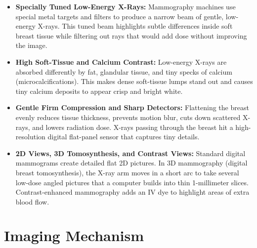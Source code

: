 \begin{itemize}
    \item \textbf{Specially Tuned Low-Energy X-Rays:} Mammography machines use special metal targets and filters to produce a narrow beam of gentle, low-energy X-rays. This tuned beam highlights subtle differences inside soft breast tissue while filtering out rays that would add dose without improving the image.
    \item \textbf{High Soft-Tissue and Calcium Contrast:} Low-energy X-rays are absorbed differently by fat, glandular tissue, and tiny specks of calcium (microcalcifications). This makes dense soft-tissue lumps stand out and causes tiny calcium deposits to appear crisp and bright white.
    \item \textbf{Gentle Firm Compression and Sharp Detectors:} Flattening the breast evenly reduces tissue thickness, prevents motion blur, cuts down scattered X-rays, and lowers radiation dose. X-rays passing through the breast hit a high-resolution digital flat-panel sensor that captures tiny details.
    \item \textbf{2D Views, 3D Tomosynthesis, and Contrast Views:} Standard digital mammograms create detailed flat 2D pictures. In 3D mammography (digital breast tomosynthesis), the X-ray arm moves in a short arc to take several low-dose angled pictures that a computer builds into thin 1-millimeter slices. Contrast-enhanced mammography adds an IV dye to highlight areas of extra blood flow.
\end{itemize}

\section{Imaging Mechanism}

